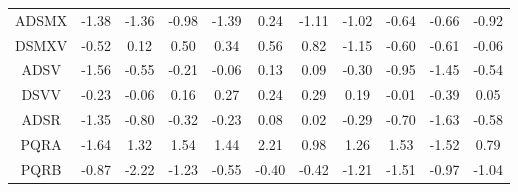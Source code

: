 \documentclass[11pt,a4paper]{report}
\begin{document}
\begin{longtable}{ | c || c | c | c | c | c | c | c | c | c || c |}
ADSMX &  \cellcolor[HTML]{FFDFDF} -1.38 &  \cellcolor[HTML]{FFDFDF} -1.36 &  \cellcolor[HTML]{FFE7E7} -0.98 &  \cellcolor[HTML]{FFDFDF} -1.39 &  \cellcolor[HTML]{F7F7FF} 0.24 &  \cellcolor[HTML]{FFE7E7} -1.11 &  \cellcolor[HTML]{FFE7E7} -1.02 &  \cellcolor[HTML]{FFEFEF} -0.64 &  \cellcolor[HTML]{FFEFEF} -0.66 &  \cellcolor[HTML]{FFE7E7} -0.92 \\
DSMXV &  \cellcolor[HTML]{FFEFEF} -0.52 &  \cellcolor[HTML]{FFFFFF} 0.12 &  \cellcolor[HTML]{EFEFFF} 0.50 &  \cellcolor[HTML]{F7F7FF} 0.34 &  \cellcolor[HTML]{EFEFFF} 0.56 &  \cellcolor[HTML]{E7E7FF} 0.82 &  \cellcolor[HTML]{FFDFDF} -1.15 &  \cellcolor[HTML]{FFEFEF} -0.60 &  \cellcolor[HTML]{FFEFEF} -0.61 &  \cellcolor[HTML]{FFFFFF} -0.06 \\
ADSV &  \cellcolor[HTML]{FFD7D7} -1.56 &  \cellcolor[HTML]{FFEFEF} -0.55 &  \cellcolor[HTML]{FFF7F7} -0.21 &  \cellcolor[HTML]{FFFFFF} -0.06 &  \cellcolor[HTML]{FFFFFF} 0.13 &  \cellcolor[HTML]{FFFFFF} 0.09 &  \cellcolor[HTML]{FFF7F7} -0.30 &  \cellcolor[HTML]{FFE7E7} -0.95 &  \cellcolor[HTML]{FFD7D7} -1.45 &  \cellcolor[HTML]{FFEFEF} -0.54 \\
DSVV &  \cellcolor[HTML]{FFF7F7} -0.23 &  \cellcolor[HTML]{FFFFFF} -0.06 &  \cellcolor[HTML]{F7F7FF} 0.16 &  \cellcolor[HTML]{F7F7FF} 0.27 &  \cellcolor[HTML]{F7F7FF} 0.24 &  \cellcolor[HTML]{F7F7FF} 0.29 &  \cellcolor[HTML]{F7F7FF} 0.19 &  \cellcolor[HTML]{FFFFFF} -0.01 &  \cellcolor[HTML]{FFF7F7} -0.39 &  \cellcolor[HTML]{FFFFFF} 0.05 \\
ADSR &  \cellcolor[HTML]{FFDFDF} -1.35 &  \cellcolor[HTML]{FFE7E7} -0.80 &  \cellcolor[HTML]{FFF7F7} -0.32 &  \cellcolor[HTML]{FFF7F7} -0.23 &  \cellcolor[HTML]{FFFFFF} 0.08 &  \cellcolor[HTML]{FFFFFF} 0.02 &  \cellcolor[HTML]{FFF7F7} -0.29 &  \cellcolor[HTML]{FFEFEF} -0.70 &  \cellcolor[HTML]{FFD7D7} -1.63 &  \cellcolor[HTML]{FFEFEF} -0.58 \\
PQRA &  \cellcolor[HTML]{FFD7D7} -1.64 &  \cellcolor[HTML]{DFDFFF} 1.32 &  \cellcolor[HTML]{D7D7FF} 1.54 &  \cellcolor[HTML]{D7D7FF} 1.44 &  \cellcolor[HTML]{C7C7FF} 2.21 &  \cellcolor[HTML]{E7E7FF} 0.98 &  \cellcolor[HTML]{DFDFFF} 1.26 &  \cellcolor[HTML]{D7D7FF} 1.53 &  \cellcolor[HTML]{FFD7D7} -1.52 &  \cellcolor[HTML]{EFEFFF} 0.79 \\
PQRB &  \cellcolor[HTML]{FFE7E7} -0.87 &  \cellcolor[HTML]{FFC7C7} -2.22 &  \cellcolor[HTML]{FFDFDF} -1.23 &  \cellcolor[HTML]{FFEFEF} -0.55 &  \cellcolor[HTML]{FFF7F7} -0.40 &  \cellcolor[HTML]{FFF7F7} -0.42 &  \cellcolor[HTML]{FFDFDF} -1.21 &  \cellcolor[HTML]{FFD7D7} -1.51 &  \cellcolor[HTML]{FFE7E7} -0.97 &  \cellcolor[HTML]{FFE7E7} -1.04 \\

\end{longtable}
\end{document}
